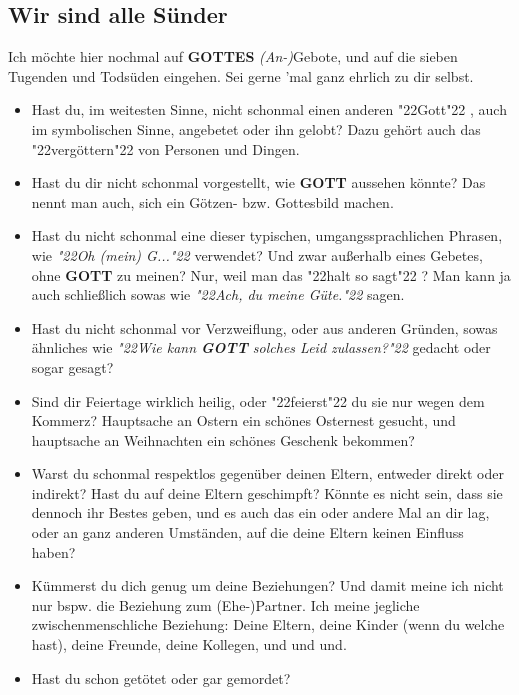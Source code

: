 \documentclass[10pt,a5paper]{article}
\newcommand{\Gottes}[0]{\textbf{GOTTES}}
\newcommand{\Gott}[0]{\textbf{GOTT}}
\newcommand{\q}[1]{\char"22{#1}\char"22 }
\newcommand{\qq}[1]{\textit{\q{#1}}}
\begin{document}
	\subsection{Wir sind alle S\"under}
		Ich m\"ochte hier nochmal auf {\Gottes} \textit{(An-)}Gebote,
		und auf die sieben Tugenden und Tods\"uden eingehen.
		Sei gerne 'mal ganz ehrlich zu dir selbst.
		\\
		\begin{itemize}[nosep]
			\item	Hast du,
					im weitesten Sinne,
					nicht schonmal einen anderen \q{Gott},
					auch im symbolischen Sinne,
					angebetet oder ihn gelobt?
					Dazu geh\"ort auch das \q{verg\"ottern} von Personen und Dingen.
			\item	Hast du dir nicht schonmal vorgestellt,
					wie {\Gott} aussehen k\"onnte?
					Das nennt man auch,
					sich ein G\"otzen- bzw. Gottesbild machen.
			\item	Hast du nicht schonmal eine dieser typischen,
					umgangssprachlichen Phrasen,
					wie \qq{Oh (mein) G...} verwendet?
					Und zwar au{\ss}erhalb eines Gebetes,
					ohne {\Gott} zu meinen?
					Nur,
					weil man das \q{halt so sagt}?
					Man kann ja auch schlie{\ss}lich sowas wie
					\qq{Ach, du meine G\"ute.}
					sagen.
			\item	Hast du nicht schonmal vor Verzweiflung,
					oder aus anderen Gr\"unden,
					sowas \"ahnliches wie
					\qq{Wie kann {\Gott} solches Leid zulassen?}
					gedacht oder sogar gesagt?
			\item	Sind dir Feiertage wirklich heilig,
					oder \q{feierst} du sie nur wegen dem Kommerz?
					Hauptsache an Ostern ein sch\"ones Osternest gesucht,
					und hauptsache an Weihnachten ein sch\"ones Geschenk bekommen?
			\item	Warst du schonmal respektlos gegen\"uber deinen Eltern,
					entweder direkt oder indirekt?
					Hast du auf deine Eltern geschimpft?
					K\"onnte es nicht sein,
					dass sie dennoch ihr Bestes geben,
					und es auch das ein oder andere Mal an dir lag,
					oder an ganz anderen Umst\"anden,
					auf die deine Eltern keinen Einfluss haben?
			\item	K\"ummerst du dich genug um deine Beziehungen?
					Und damit meine ich nicht nur bspw. die Beziehung zum (Ehe-)Partner.
					Ich meine jegliche zwischenmenschliche Beziehung:
					Deine Eltern,
					deine Kinder (wenn du welche hast),
					deine Freunde,
					deine Kollegen,
					und und und.
			\item	Hast du schon get\"otet oder gar gemordet?

\end{itemize}
\end{document}

